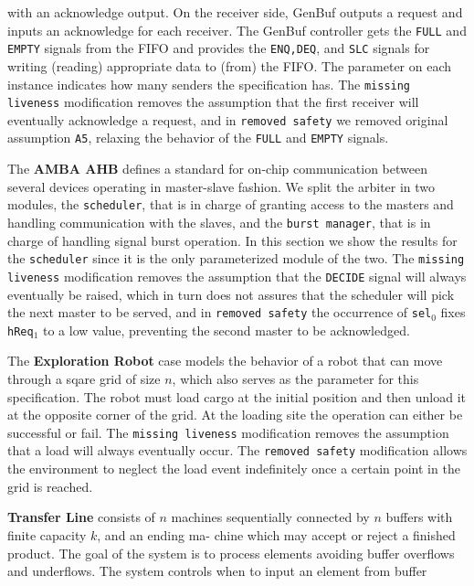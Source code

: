 \begin{description}[align=left,leftmargin=0.7cm,font=\normalfont,style=nextline,itemsep=0pt]
with an acknowledge output. On the receiver side, GenBuf outputs a request and inputs an
acknowledge for each receiver. The GenBuf controller gets the \texttt{FULL} and \texttt{EMPTY} signals from the FIFO and
provides the \texttt{ENQ,DEQ}, and \texttt{SLC} signals for writing (reading) appropriate data to (from) the FIFO.
The parameter on each instance indicates how many senders the specification has. The \texttt{missing liveness} modification removes the assumption that the first receiver will eventually acknowledge a request, and in \texttt{removed safety} we removed original assumption \texttt{A5}, relaxing the behavior of the \texttt{FULL} and \texttt{EMPTY} signals.
\item[AB] The \textbf{AMBA AHB} defines a standard for on-chip communication between several devices operating in master-slave fashion. We split the arbiter in two modules, the \texttt{scheduler}, that is in charge of granting access to the masters and handling communication with the slaves, and the \texttt{burst manager}, that is in charge of handling signal burst operation. In this section we show the results for the \texttt{scheduler} since it is the only parameterized module of the two. 
The \texttt{missing liveness} modification removes the assumption that the \texttt{DECIDE} signal will always eventually be raised, which in turn does not assures that the scheduler will pick the next master to be served, and in \texttt{removed safety} the occurrence of \texttt{sel$_0$} fixes \texttt{hReq$_1$} to a low value, preventing the second master to be acknowledged. 
\item[ER] The \textbf{Exploration Robot} case models the behavior of a robot that can move through a sqare grid of size $n$, which also serves as the parameter for this specification. The robot must load cargo at the initial position and then unload it at the opposite corner of the grid. At the loading site the operation can either be successful or fail. The \texttt{missing liveness} modification removes the assumption that a load will always eventually occur. The \texttt{removed safety} modification allows the environment to neglect the load event indefinitely once a certain point in the grid is reached.
\item[TL] \textbf{Transfer Line} consists of $n$ machines
sequentially connected by $n$ buffers with finite capacity $k$, and an ending ma-
chine which may accept or reject a
finished product. The goal of the system is to process
elements avoiding buffer overflows and underflows. The
system controls when to input an element from buffer

\end{description}
